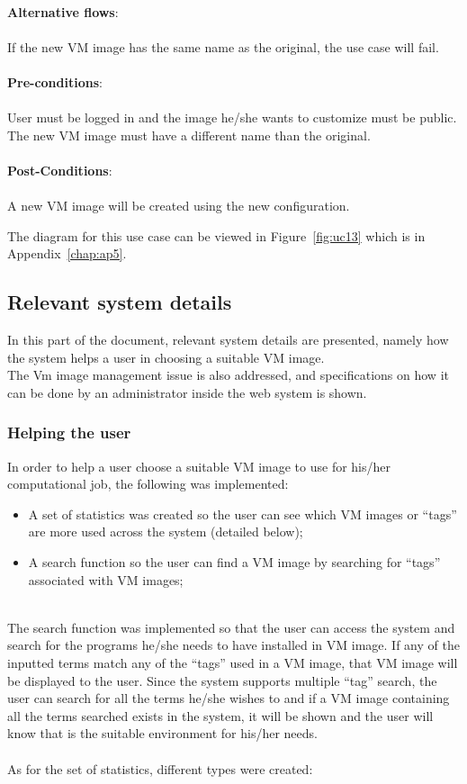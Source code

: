 \ \\
\textbf{Alternative flows}:\\
\ \\
If the new VM image has the same name as the original, the use case will fail.\\
\ \\
\textbf{Pre-conditions}:\\
\ \\
User must be logged in and the image he/she wants to customize must be public. The new VM image must have a different name than the original.\\
\ \\
\textbf{Post-Conditions}:\\
\ \\
A new VM image will be created using the new configuration.

The diagram for this use case can be viewed in Figure~\ref{fig:uc13} which is in Appendix~\ref{chap:ap5}.

\subsection{Relevant system details}%

In this part of the document, relevant system details are presented, namely how the system helps a user in choosing a suitable VM image.\ \\
The Vm image management issue is also addressed, and specifications on how it can be done by an administrator inside the web system is shown.

\subsubsection{Helping the user}\label{subsubsec:help}


In order to help a user choose a suitable VM image to use for his/her computational job, the following was implemented:

\begin{itemize}
\item A set of statistics was created so the user can see which VM images or ``tags'' are more used across the system (detailed below);
\item A search function so the user can find a VM image by searching for ``tags'' associated with VM images;
\end{itemize}

\ \\
The search function was implemented so that the user can access the system and search for the programs he/she needs to have installed in VM image. If any of the inputted terms match any of the ``tags'' used in a VM image, that VM image will be displayed to the user. Since the system supports multiple ``tag'' search, the user can search for all the terms he/she wishes to and if a VM image containing all the terms searched exists in the system, it will be shown and the user will know that is the suitable environment for his/her needs.\\
\ \\
As for the set of statistics, different types were created:


